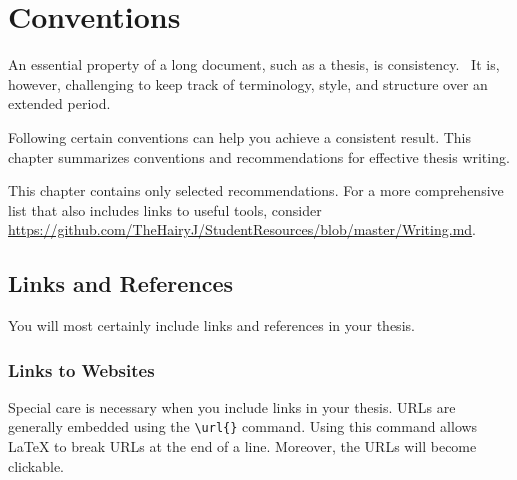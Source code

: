 \chapter{Conventions} %

\label{Chapter2} %


An essential property of a long document, such as a thesis, is consistency.%
\ 
It is, however, challenging to keep track of terminology, style, and structure over an extended period.

Following certain conventions can help you achieve a consistent result. This chapter summarizes conventions and recommendations for effective thesis writing.

This%
 chapter contains only selected recommendations. For a more comprehensive list that also includes links to useful tools, consider \url{https://github.com/TheHairyJ/StudentResources/blob/master/Writing.md}.

\section{Links and References}

You will most certainly include links and references in your thesis.

\subsection{Links to Websites}

Special care is necessary when you include links in your thesis. URLs are generally embedded using the \verb|\url{}| command. Using this command allows LaTeX to break URLs at the end of a line. Moreover, the URLs will become clickable.

